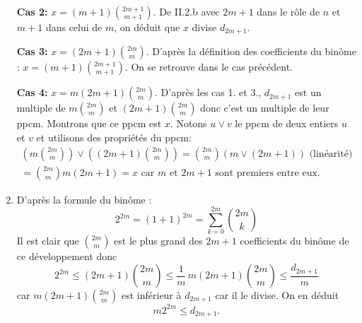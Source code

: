 \begin{enumerate}
\textbf{Cas 2:} $x=(m+1)\binom{2m+1}{m+1}$.\newline 
De II.2.b avec $2m +1$ dans le rôle de $n$ et $m+1$ dans celui de $m$, on déduit que $x$ divise $d_{2m+1}$.

\textbf{Cas 3:} $x=(2m+1)\binom{2m}{m}$.\newline 
D'après la définition des coefficients du binôme : $x=(m+1)\binom{2m+1}{m+1}$. On se retrouve dans le cas précédent.

\textbf{Cas 4:} $x=m(2m+1)\binom{2m}{m}$.\newline 
D'après les cas 1. et 3., $d_{2m+1}$ est un multiple de $m\binom{2m}{m}$ et $(2m+1)\binom{2m}{m}$ donc c'est un multiple de leur ppcm. Montrons que ce ppcm est $x$.\newline
Notons $u\vee v$ le ppcm de deux entiers $u$ et $v$ et utilisons des propriétés du ppcm: 
\begin{multline*}
 \left( m\binom{2m}{m}\right)\vee \left((2m+1)\binom{2m}{m} \right)
 = \binom{2m}{m} \left( m \vee (2m+1)\right) \text{ (linéarité)}\\
 = \binom{2m}{m} m (2m+1) = x \text{ car $m$ et $2m+1$ sont premiers entre eux.}
\end{multline*}

 \item D'après la formule du binôme :
\begin{displaymath}
 2^{2m}=(1+1)^{2m}=\sum_{k=0}^{2m} \binom{2m}{k}
\end{displaymath}
Il est clair que $\binom{2m}{m}$ est le plus grand des $2m+1$ coefficients du binôme de ce développement donc
\begin{displaymath}
 2^{2m}\leq(2m+1)\binom{2m}{m}\leq \frac{1}{m}\, m(2m+1)\binom{2m}{m} \leq \frac{d_{2m+1}}{m}
\end{displaymath}
car $m(2m+1)\binom{2m}{m}$ est inférieur à $d_{2m+1}$ car il le divise. On en déduit 
\begin{displaymath}
 m2^{2m}\leq d_{2m+1}. 
\end{displaymath}
\end{enumerate}


